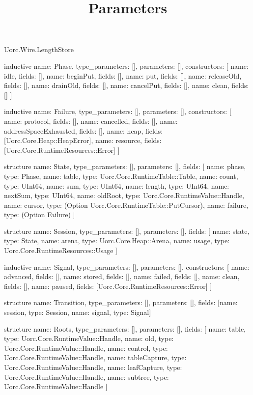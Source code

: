 \begin{lexlean}{Uorc.Wire.LengthStore}
\title{Parameters}
\begin{semanticmodule}
inductive{
  name: Phase,
  type_parameters: [],
  parameters: [],
  constructors: [
    {name: idle, fields: []},
    {name: beginPut, fields: []},
    {name: put, fields: []},
    {name: releaseOld, fields: []},
    {name: drainOld, fields: []},
    {name: cancelPut, fields: []},
    {name: clean, fields: []}
  ]
}

inductive{
  name: Failure,
  type_parameters: [],
  parameters: [],
  constructors: [
    {name: protocol, fields: []},
    {name: cancelled, fields: []},
    {name: addressSpaceExhausted, fields: []},
    {name: heap, fields: [Uorc.Core.Heap::HeapError]},
    {name: resource, fields: [Uorc.Core.RuntimeResources::Error]}
  ]
}

structure{
  name: State,
  type_parameters: [],
  parameters: [],
  fields: [
    {name: phase, type: Phase},
    {name: table, type: Uorc.Core.RuntimeTable::Table},
    {name: count, type: UInt64},
    {name: sum, type: UInt64},
    {name: length, type: UInt64},
    {name: nextSum, type: UInt64},
    {name: oldRoot, type: Uorc.Core.RuntimeValue::Handle},
    {name: cursor, type: (Option Uorc.Core.RuntimeTable::PutCursor)},
    {name: failure, type: (Option Failure)}
  ]
}

structure{
  name: Session,
  type_parameters: [],
  parameters: [],
  fields: [
    {name: state, type: State},
    {name: arena, type: Uorc.Core.Heap::Arena},
    {name: usage, type: Uorc.Core.RuntimeResources::Usage}
  ]
}

inductive{
  name: Signal,
  type_parameters: [],
  parameters: [],
  constructors: [
    {name: advanced, fields: []},
    {name: stored, fields: []},
    {name: failed, fields: []},
    {name: clean, fields: []},
    {name: paused, fields: [Uorc.Core.RuntimeResources::Error]}
  ]
}

structure{
  name: Transition,
  type_parameters: [],
  parameters: [],
  fields: [{name: session, type: Session}, {name: signal, type: Signal}]
}

structure{
  name: Roots,
  type_parameters: [],
  parameters: [],
  fields: [
    {name: table, type: Uorc.Core.RuntimeValue::Handle},
    {name: old, type: Uorc.Core.RuntimeValue::Handle},
    {name: control, type: Uorc.Core.RuntimeValue::Handle},
    {name: tableCapture, type: Uorc.Core.RuntimeValue::Handle},
    {name: leafCapture, type: Uorc.Core.RuntimeValue::Handle},
    {name: subtree, type: Uorc.Core.RuntimeValue::Handle}
  ]
}


\end{semanticmodule}
\end{lexlean}
